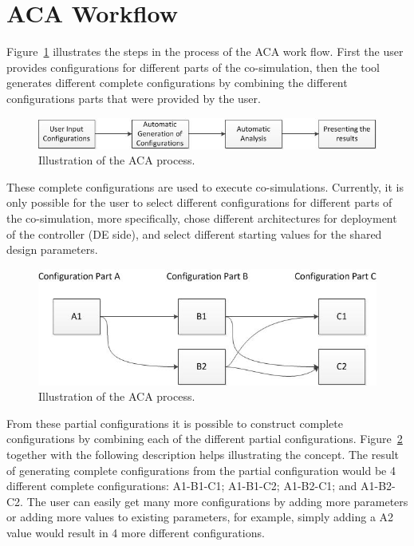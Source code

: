 \documentclass{crescendorepchap}
\begin{document}
\section{ACA Workflow}

Figure~\ref{fig:acaworkflow} illustrates the steps in the process of the ACA work
flow. First the user provides configurations for different parts of the
co-simulation, then the tool generates different complete configurations
by combining the different configurations parts that were provided by
the user.

\begin{figure}[htbp]
\centering
\includegraphics[width=.6\textwidth]{images/ACAworkflow.jpg}
\caption{Illustration of the ACA process.}
\label{fig:acaworkflow}
\end{figure}

These complete configurations are used to execute co-simulations. 
Currently, it is only possible for the user to select different
configurations for different parts of the co-simulation, more
specifically, chose different architectures for deployment of the
controller (DE side), and select different starting values for the
shared design parameters.

\begin{figure}[htbp]
\centering
\includegraphics[width=.6\textwidth]{images/ACAconcept.jpg}
\caption{Illustration of the ACA process.}
\label{fig:acaprocess}
\end{figure}

From these partial configurations it is possible to construct complete
configurations by combining each of the different partial
configurations. Figure~\ref{fig:acaprocess} together with the following description
helps illustrating the concept. The result of generating complete
configurations from the partial configuration would be 4 different
complete configurations: A1-B1-C1; A1-B1-C2; A1-B2-C1; and A1-B2-C2. The
user can easily get many more configurations by adding more parameters
or adding more values to existing parameters, for example, simply adding
a A2 value would result in 4 more different configurations.
\end{document}
